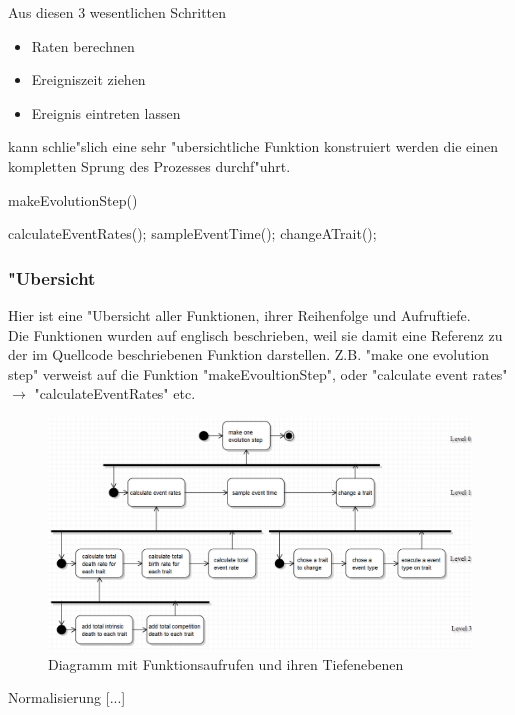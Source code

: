 \documentclass[11pt, a4paper, german]{article}
\begin{document}
	Aus diesen 3 wesentlichen Schritten
	\begin{itemize}
		\item Raten berechnen
		\item Ereigniszeit ziehen
		\item Ereignis eintreten lassen
	\end{itemize}
	kann schlie"slich eine sehr "ubersichtliche Funktion konstruiert werden die einen kompletten Sprung des Prozesses durchf"uhrt.
	\begin{algorithm}[H]
 		\caption{makeEvolutionStep()}
 		\begin{algorithmic}[1]
 			\STATE calculateEventRates();
 			\STATE sampleEventTime();
 			\STATE changeATrait();
 		\end{algorithmic}
 	\end{algorithm}
	 	
	\subsubsection{"Ubersicht}
	Hier ist eine "Ubersicht aller Funktionen, ihrer Reihenfolge und Aufruftiefe. \\
	Die Funktionen wurden auf englisch beschrieben, weil sie damit eine Referenz zu der im Quellcode beschriebenen Funktion darstellen. Z.B. "{}make one evolution step"{} verweist auf die Funktion "{}makeEvoultionStep"{}, oder "{}calculate event rates"{} $ \to $ "{}calculateEventRates"{} etc.
	\begin{figure}[H]
		\centering
		\includegraphics[width=1\linewidth]{../UMLs/PseudoCodeForBThesis}
		\caption{Diagramm mit Funktionsaufrufen und ihren Tiefenebenen}
		\label{fig:PseudoCodeForBThesis}
	\end{figure}
	Normalisierung [...]
	
\end{document}
